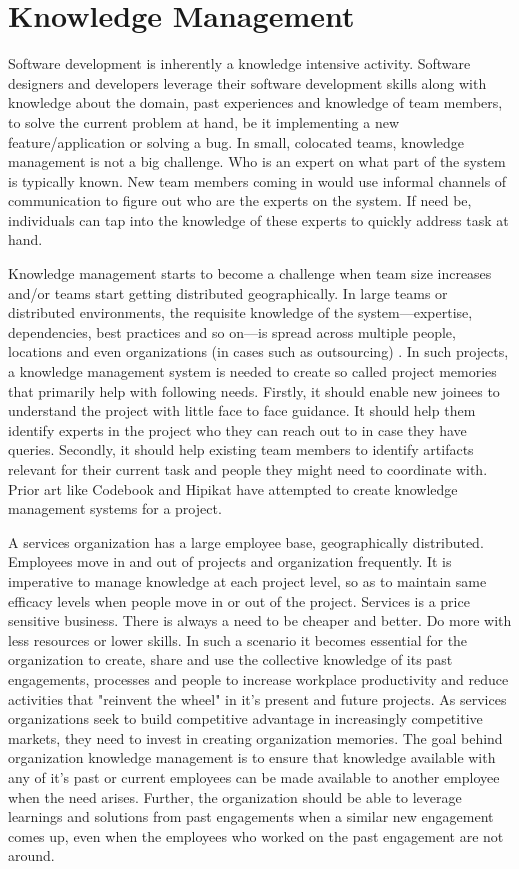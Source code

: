 
\section{Knowledge Management}
\label{sec:km}

Software development is inherently a knowledge intensive activity. Software designers and developers leverage their software development skills along with knowledge about the domain, past experiences and knowledge of team members, to solve the current problem at hand, be it implementing a new feature/application or solving a bug. 
In small, colocated teams, knowledge management is not a big challenge. Who is an expert on what part of the system is typically known. New team members coming in would use informal channels of communication to figure out who are the experts on the system. If need be, individuals can tap into the knowledge of these experts to quickly address task at hand. 

Knowledge management starts to become a challenge when team size increases and/or teams start getting distributed geographically. In large teams or distributed environments, the requisite knowledge of the system---expertise, dependencies, best practices and so on---is spread across multiple people, locations and even organizations (in cases such as outsourcing) \cite{Desouza:2006}. In such projects, a knowledge management system is needed to create so called project memories that primarily help with following needs. Firstly, it should enable new joinees to understand the project with little face to face guidance. It should help them identify experts in the project who they can reach out to in case they have queries. Secondly, it should help existing team members to identify artifacts relevant for their current task and people they might need to coordinate with. Prior art like Codebook \cite{Begel:2010} and Hipikat \cite{Murphy:2005} have attempted to create knowledge management systems for a project. 

A services organization has a large employee base, geographically distributed. Employees move in and out of projects and organization frequently. It is imperative to manage knowledge at each project level, so as to maintain same efficacy levels when people move in or out of the project. 
Services is a price sensitive business. There is always a need to be cheaper and better. Do more with less resources or lower skills. In such a scenario it becomes essential for the organization to create, share and use the collective knowledge of its past engagements, processes and people to increase workplace productivity and reduce activities that "reinvent the wheel" in it's present and future projects. As services organizations seek to build competitive advantage in increasingly competitive markets, they need to invest in creating organization memories.
The goal behind organization knowledge management is to ensure that knowledge available with any of it's past or current employees can be made available to another employee when the need arises. Further, the organization should be able to leverage learnings and solutions from past engagements when a similar new engagement comes up, even when the employees who worked on the past engagement are not around.

